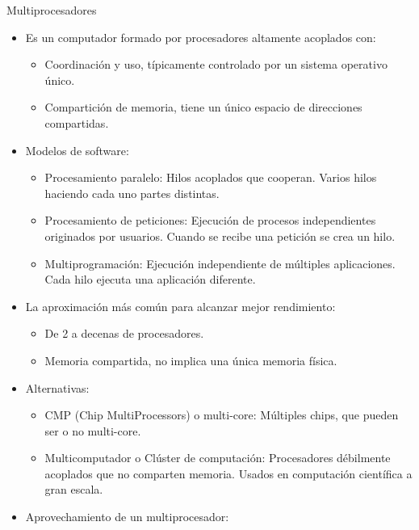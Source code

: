 \documentclass[12pt, twoside, openright]{report} %
\begin{document}
    Multiprocesadores
    \vspace{-0.5cm}

    \begin{itemize}
    \item
      Es un computador formado por procesadores altamente acoplados
      con:

      \begin{itemize}
      
      \item
        Coordinación y uso, típicamente controlado por un sistema
        operativo único.
      \item
        Compartición de memoria, tiene un único espacio de direcciones
        compartidas.
      \end{itemize}
    \item
      Modelos de software:

      \begin{itemize}
      
      \item
        Procesamiento paralelo: Hilos acoplados que cooperan. Varios
        hilos haciendo cada uno partes distintas.
      \item
        Procesamiento de peticiones: Ejecución de procesos
        independientes originados por usuarios. Cuando se recibe una
        petición se crea un hilo.
      \item
        Multiprogramación: Ejecución independiente de múltiples
        aplicaciones. Cada hilo ejecuta una aplicación diferente.
      \end{itemize}
      \pagebreak
    \item
      La aproximación más común para alcanzar mejor rendimiento:

      \begin{itemize}
      
      \item
        De 2 a decenas de procesadores.
      \item
        Memoria compartida, no implica una única memoria física.
      \end{itemize}
    \item
      Alternativas:

      \begin{itemize}
      
      \item
        CMP (Chip MultiProcessors) o multi-core: Múltiples chips, que
        pueden ser o no multi-core.
      \item
        Multicomputador o Clúster de computación: Procesadores
        débilmente acoplados que no comparten memoria. Usados en
        computación científica a gran escala.
      \end{itemize}
    \item
      Aprovechamiento de un multiprocesador:


\end{itemize}
\end{document}

